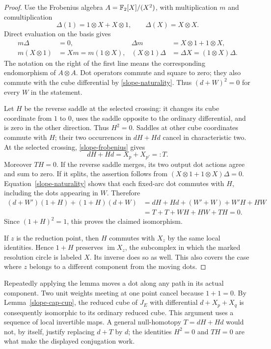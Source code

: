 \begin{proof}
Use the Frobenius algebra $A=\mathbb F_2[X]/(X^2)$, with multiplication $m$ and
comultiplication
\[
 \Delta(1)=1\otimes X+X\otimes1,\qquad
 \Delta(X)=X\otimes X.
\]
Direct evaluation on the basis gives
\begin{align}
 m\Delta&=0,&
 \Delta m&=X\otimes1+1\otimes X,\label{slope-frobenius}\\
 m(X\otimes1)&=Xm=m(1\otimes X),&
 (X\otimes1)\Delta&=\Delta X=(1\otimes X)\Delta.
 \label{slope-naturality}
\end{align}
The notation on the right of the first line means the corresponding
endomorphism of $A\otimes A$.
Dot operators commute and square to zero; they also commute with the cube
differential by \eqref{slope-naturality}. Thus $(d+W)^2=0$ for every $W$
in the statement.

Let $H$ be the reverse saddle at the selected crossing: it changes its cube
coordinate from $1$ to $0$, uses the saddle opposite to the ordinary
differential, and is zero in the other direction. Thus $H^2=0$.
Saddles at other cube coordinates commute with $H$; their two occurrences
in $dH+Hd$ cancel in characteristic two. At the selected crossing,
\eqref{slope-frobenius} gives
\[
 dH+Hd=X_p+X_{p'}=:T.
\]
Moreover $TH=0$. If the reverse saddle merges, its two output dot actions
agree and sum to zero. If it splits, the assertion follows from
$(X\otimes1+1\otimes X)\Delta=0$. Equation~\eqref{slope-naturality}
shows that each fixed-arc dot commutes with $H$, including the dots
appearing in $W$. Therefore
\begin{align*}
 (d+W')(1+H)+(1+H)(d+W)
 &=dH+Hd+(W'+W)+W'H+HW\\
 &=T+T+WH+HW+TH=0.
\end{align*}
Since $(1+H)^2=1$, this proves the claimed isomorphism.

If $z$ is the reduction point, then $H$ commutes with $X_z$ by the same
local identities. Hence $1+H$ preserves $\operatorname{im}X_z$, the
subcomplex in which the marked resolution circle is labeled $X$. Its
inverse does so as well. This also covers the case where $z$ belongs to a
different component from the moving dots.
\end{proof}

Repeatedly applying the lemma moves a dot along any path in its actual
component. Two unit weights meeting at one point cancel because $1+1=0$.
By Lemma~\ref{slope-cap-cup}, the reduced cube of $J_E$ with differential
$d+X_p+X_q$ is consequently isomorphic to its ordinary reduced cube.
This argument uses a sequence of local invertible maps. A general
null-homotopy $T=dH+Hd$ would not, by itself, justify replacing $d+T$ by
$d$; the identities $H^2=0$ and $TH=0$ are what make the displayed
conjugation work.

